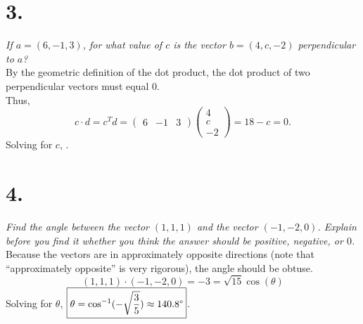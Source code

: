 \documentclass[12pt]{article}
\begin{document}
\section*{3.}
\textit{If $a = (6, -1, 3)$, for what value of $c$ is the vector
$b = (4, c, -2)$ perpendicular to $a$?}\\[\baselineskip]
By the geometric definition of the dot product, the dot product of two
perpendicular vectors must equal $0$. \\[\baselineskip]
Thus,
\begin{equation*}
	c \cdot d = c^T d =
	\begin{pmatrix} 6 & -1 & 3 \end{pmatrix}
	\begin{pmatrix} 4 \\ c \\ -2 \end{pmatrix}
	= 18 - c = 0.
\end{equation*}
Solving for $c$, .

\section*{4.}
\textit{Find the angle between the vector $(1, 1, 1)$ and the vector
$(-1, -2, 0)$. Explain before you find it whether you think the answer should
be positive, negative, or $0$.} \\[\baselineskip]
Because the vectors are in approximately opposite directions (note that
``approximately opposite'' is very rigorous), the angle should be obtuse.
\\[\baselineskip]
\begin{equation*}
	(1, 1, 1) \cdot (-1, -2, 0)
	=
	-3
	=
	\sqrt{15} \cos(\theta)
\end{equation*}
Solving for $\theta$,
$\boxed{\theta = \cos^{-1}(-\sqrt{\frac{3}{5}}) \approx 140.8 \degree}$.
\end{document}
